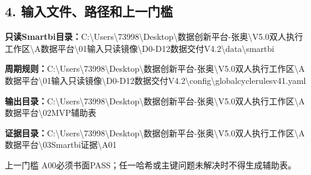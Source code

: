 \documentclass[UTF8,openany,zihao=-4]{ctexbook}
\renewcommand{\_}{\textunderscore\allowbreak}
\begin{document}
\subsection*{4. 输入文件、路径和上一门槛}
\noindent\textbf{只读Smartbi目录：}{\promptlatin\promptcjk\small C:\textbackslash{}\allowbreak{}Users\textbackslash{}\allowbreak{}73998\textbackslash{}\allowbreak{}Desktop\textbackslash{}\allowbreak{}数据创新平台-\allowbreak{}张奥\textbackslash{}\allowbreak{}V5.0\_\allowbreak{}双人执行工作区\textbackslash{}\allowbreak{}A\_\allowbreak{}数据平台\textbackslash{}\allowbreak{}01\_\allowbreak{}输入只读镜像\textbackslash{}\allowbreak{}D0-\allowbreak{}D12\_\allowbreak{}数据交付\_\allowbreak{}V4.2\textbackslash{}\allowbreak{}data\textbackslash{}\allowbreak{}smartbi}\par
\noindent\textbf{周期规则：}{\promptlatin\promptcjk\small C:\textbackslash{}\allowbreak{}Users\textbackslash{}\allowbreak{}73998\textbackslash{}\allowbreak{}Desktop\textbackslash{}\allowbreak{}数据创新平台-\allowbreak{}张奥\textbackslash{}\allowbreak{}V5.0\_\allowbreak{}双人执行工作区\textbackslash{}\allowbreak{}A\_\allowbreak{}数据平台\textbackslash{}\allowbreak{}01\_\allowbreak{}输入只读镜像\textbackslash{}\allowbreak{}D0-\allowbreak{}D12\_\allowbreak{}数据交付\_\allowbreak{}V4.2\textbackslash{}\allowbreak{}config\textbackslash{}\allowbreak{}global\_\allowbreak{}cycle\_\allowbreak{}rules\_\allowbreak{}v41.yaml}\par
\noindent\textbf{输出目录：}{\promptlatin\promptcjk\small C:\textbackslash{}\allowbreak{}Users\textbackslash{}\allowbreak{}73998\textbackslash{}\allowbreak{}Desktop\textbackslash{}\allowbreak{}数据创新平台-\allowbreak{}张奥\textbackslash{}\allowbreak{}V5.0\_\allowbreak{}双人执行工作区\textbackslash{}\allowbreak{}A\_\allowbreak{}数据平台\textbackslash{}\allowbreak{}02\_\allowbreak{}MVP辅助表}\par
\noindent\textbf{证据目录：}{\promptlatin\promptcjk\small C:\textbackslash{}\allowbreak{}Users\textbackslash{}\allowbreak{}73998\textbackslash{}\allowbreak{}Desktop\textbackslash{}\allowbreak{}数据创新平台-\allowbreak{}张奥\textbackslash{}\allowbreak{}V5.0\_\allowbreak{}双人执行工作区\textbackslash{}\allowbreak{}A\_\allowbreak{}数据平台\textbackslash{}\allowbreak{}03\_\allowbreak{}Smartbi证据\textbackslash{}\allowbreak{}A01}\par
\begin{gatebox}{上一门槛}
A00必须书面PASS；任一哈希或主键问题未解决时不得生成辅助表。

\end{gatebox}
\end{document}
